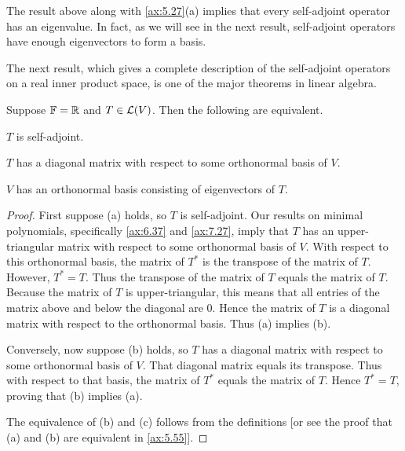 The result above along with \ref{ax:5.27}(a) implies that every self-adjoint
operator has an eigenvalue. In fact, as we will see in the next result,
self-adjoint operators have enough eigenvectors to form a basis.

The next result, which gives a complete description of the self-adjoint
operators on a real inner product space, is one of the major theorems in linear
algebra.

\begin{result}\label{ax:7.29}
Suppose $\mathbb{F}=\mathbb{R}$ and $T\in\mathcal{L}(V)$. Then the following are equivalent.
\begin{parts}
\item $T$ is self-adjoint.
\item $T$ has a diagonal matrix with respect to some orthonormal basis of $V$.
\item $V$ has an orthonormal basis consisting of eigenvectors of $T$.
\end{parts}
\end{result}

\begin{proof}
First suppose (a) holds, so $T$ is self-adjoint. Our results on minimal
polynomials, specifically \ref{ax:6.37} and \ref{ax:7.27}, imply that $T$ has
an upper-triangular matrix with respect to some orthonormal basis of $V$. With
respect to this orthonormal basis, the matrix of $T^*$ is the transpose of the
matrix of $T$. However, $T^*=T$. Thus the transpose of the matrix of $T$ equals
the matrix of $T$. Because the matrix of $T$ is upper-triangular, this means
that all entries of the matrix above and below the diagonal are $0$. Hence the
matrix of $T$ is a diagonal matrix with respect to the orthonormal basis. Thus
(a) implies (b).

Conversely, now suppose (b) holds, so $T$ has a diagonal matrix with respect to
some orthonormal basis of $V$. That diagonal matrix equals its transpose. Thus
with respect to that basis, the matrix of $T^*$ equals the matrix of $T$. Hence
$T^*=T$, proving that (b) implies (a).

The equivalence of (b) and (c) follows from the definitions [or see the proof
that (a) and (b) are equivalent in \ref{ax:5.55}].
\end{proof}


